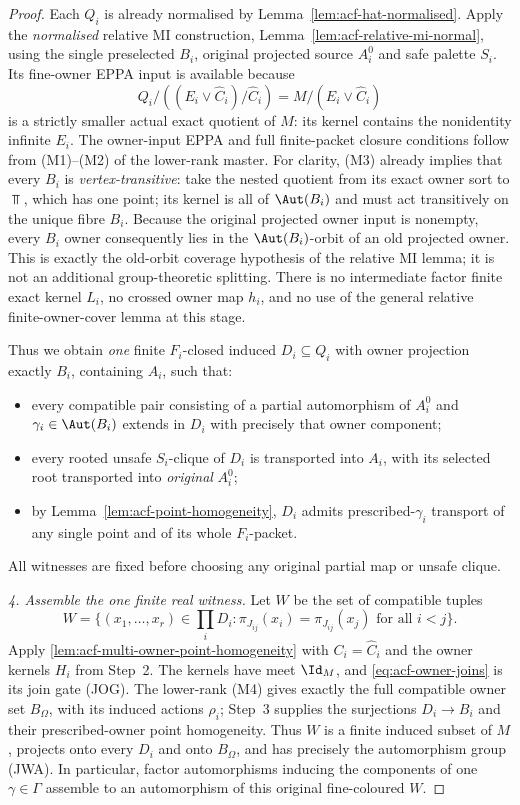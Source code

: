 \begin{proof}
Each \(Q_i\) is already normalised by
Lemma~\ref{lem:acf-hat-normalised}.  Apply the \emph{normalised}
relative MI construction, Lemma~\ref{lem:acf-relative-mi-normal},
using the single preselected \(B_i\), original projected source
\(A_i^0\) and safe palette \(S_i\). Its fine-owner EPPA input is
available because
\[
 Q_i/((E_i\vee\widehat C_i)/\widehat C_i)
                   =M/(E_i\vee\widehat C_i)
\]
is a strictly smaller actual exact quotient of \(M\): its
kernel contains the nonidentity infinite \(E_i\).
The owner-input EPPA and full finite-packet closure conditions
follow from (M1)--(M2) of the lower-rank master.  For
clarity, (M3) already implies that every $B_i$ is
\emph{vertex-transitive}: take the nested quotient from its
exact owner sort to $\Top$, which has one point; its kernel is
all of $\Aut(B_i)$ and must act transitively on the unique
fibre $B_i$.  Because the original projected owner input is
nonempty, every $B_i$ owner consequently lies in the
$\Aut(B_i)$-orbit of an old projected owner.  This is
exactly the old-orbit coverage hypothesis of the relative
MI lemma; it is not an additional group-theoretic splitting.
There is no intermediate factor finite exact kernel \(L_i\),
no crossed owner map \(h_i\), and no use of the general
relative finite-owner-cover lemma at this stage.

Thus we obtain \emph{one} finite
\(F_i\)-closed induced \(D_i\subseteq Q_i\)
with owner projection exactly \(B_i\),
containing \(A_i\), such that:
\begin{itemize}
\item every compatible pair consisting of a
  partial automorphism of \(A_i^0\) and
  \(\gamma_i\in\Aut(B_i)\) extends in \(D_i\)
  with precisely that owner component;
\item every rooted unsafe \(S_i\)-clique of
  \(D_i\) is transported into \(A_i\), with
  its selected root transported into
  \emph{original} \(A_i^0\);
\item by Lemma~\ref{lem:acf-point-homogeneity},
  \(D_i\) admits prescribed-\(\gamma_i\)
  transport of any single point and of
  its whole \(F_i\)-packet.
\end{itemize}
All witnesses are fixed before choosing any
original partial map or unsafe clique.

\medskip\noindent
\emph{4. Assemble the one finite real witness.}
Let \(W\) be the set of compatible tuples
\[
 W=\bigl\{(x_1,\ldots,x_r)\in\prod_iD_i:
 \pi_{J_{ij}}(x_i)=\pi_{J_{ij}}(x_j)
                          \text{ for all }i<j\bigr\}.
\]
Apply \cref{lem:acf-multi-owner-point-homogeneity} with
$C_i=\widehat C_i$ and the owner kernels $H_i$ from Step~2.
The kernels have meet $\Id_M$, and
\eqref{eq:acf-owner-joins} is its join gate (JOG).
The lower-rank (M4) gives exactly the full compatible owner
set $B_\Omega$, with its induced actions $\rho_i$;
Step~3 supplies the surjections $D_i\to B_i$ and their
prescribed-owner point homogeneity. Thus $W$ is a finite
induced subset of $M$, projects onto every $D_i$ and onto
$B_\Omega$, and has precisely the automorphism group (JWA).
In particular, factor automorphisms inducing the components
of one $\gamma\in\Gamma$ assemble to an automorphism of
this original fine-coloured $W$.


\end{proof}
